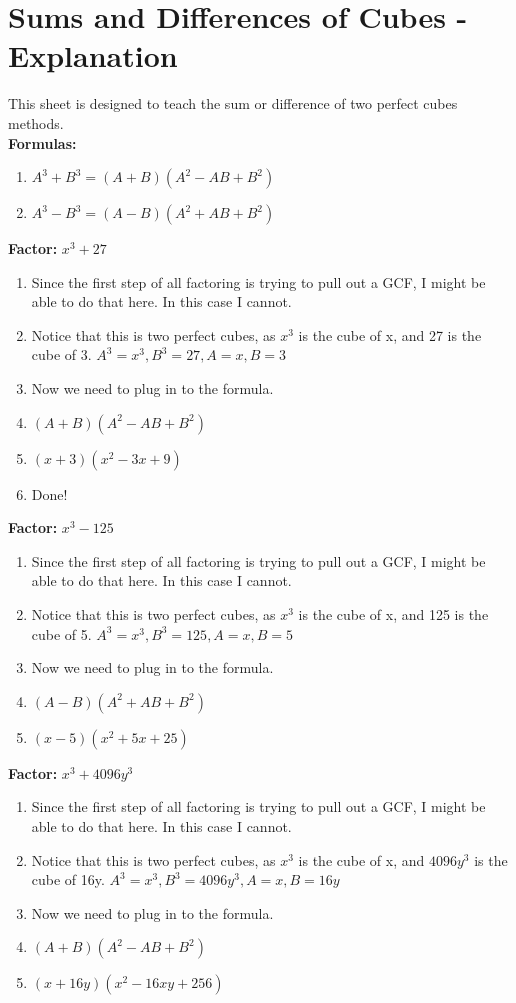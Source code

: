 \documentclass{article}
\begin{document}
\newpage
\section{Sums and Differences of Cubes - Explanation}
This sheet is designed to teach the sum or difference of two perfect cubes methods. \\
\textbf{Formulas:} \\
\begin{enumerate}
\item [] $A^{3}+B^{3} = (A+B)(A^{2}-AB+B^{2})$
\item [] $A^{3}-B^{3} = (A-B)(A^{2}+AB+B^{2})$
\end{enumerate}
\textbf{Factor:} $x^{3} + 27$\\
\begin{enumerate}
\item Since the first step of all factoring is trying to pull out a GCF, I might be able to do that here. In this case I cannot.
\item Notice that this is two perfect cubes, as $x^{3}$ is the cube of x, and 27 is the cube of 3. $A^{3}=x^{3}, B^{3}=27, A=x, B=3$
\item Now we need to plug in to the formula.
\item [] $(A+B)(A^{2}-AB+B^{2})$
\item [] $(x+3)(x^{2}-3x+9)$
\item Done!
\end{enumerate}
\textbf{Factor:} $x^{3} - 125$\\
\begin{enumerate}
\item Since the first step of all factoring is trying to pull out a GCF, I might be able to do that here. In this case I cannot.
\item Notice that this is two perfect cubes, as $x^{3}$ is the cube of x, and 125 is the cube of 5. $A^{3}=x^{3}, B^{3}=125, A=x, B=5$
\item Now we need to plug in to the formula.
\item [] $(A-B)(A^{2}+AB+B^{2})$
\item [] $(x-5)(x^{2}+5x+25)$
\end{enumerate}
\textbf{Factor:} $x^{3} + 4096y^{3}$\\
\begin{enumerate}
\item Since the first step of all factoring is trying to pull out a GCF, I might be able to do that here. In this case I cannot.
\item Notice that this is two perfect cubes, as $x^{3}$ is the cube of x, and $4096y^{3}$ is the cube of 16y. $A^{3}=x^{3}, B^{3}=4096y^{3}, A=x, B=16y$
\item Now we need to plug in to the formula.
\item [] $(A+B)(A^{2}-AB+B^{2})$
\item [] $(x+16y)(x^{2}-16xy+256)$
\end{enumerate}
\end{document}
